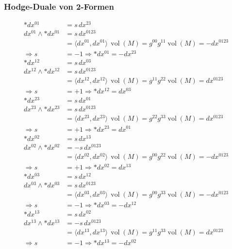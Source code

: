 \subsubsection{Hodge-Duale von 2-Formen}
\begin{align*}
	\ast dx^{01} &= s \, dx^{23} \\
	dx^{01} \wedge \ast dx^{01} &= s \, dx^{0123} \\
	&= \langle dx^{01}, dx^{01} \rangle \, \operatorname{vol}(M) 
	= g^{00} g^{11} \operatorname{vol}(M) = -dx^{0123} \\
	\Rightarrow s &= -1 \Rightarrow \boxed{\ast dx^{01} = - dx^{23}}
	\\[1em]
	\ast dx^{12} &= s \, dx^{03} \\
	dx^{12} \wedge \ast dx^{12} &= s \, dx^{0123} \\
	&= \langle dx^{12}, dx^{12} \rangle \, \operatorname{vol}(M) 
	= g^{11} g^{22} \operatorname{vol}(M) = dx^{0123} \\
	\Rightarrow s &= +1 \Rightarrow \boxed{\ast dx^{12} = dx^{03}}
	\\[1em]
	\ast dx^{23} &= s \, dx^{01} \\
	dx^{23} \wedge \ast dx^{23} &= s \, dx^{0123} \\
	&= \langle dx^{23}, dx^{23} \rangle \, \operatorname{vol}(M) 
	= g^{22} g^{33} \operatorname{vol}(M) = dx^{0123} \\
	\Rightarrow s &= +1 \Rightarrow \boxed{\ast dx^{23} = dx^{01}}
	\\[1em]
	\ast dx^{02} &= s \, dx^{13} \\
	dx^{02} \wedge \ast dx^{02} &= -s \, dx^{0123} \\
	&= \langle dx^{02}, dx^{02} \rangle \, \operatorname{vol}(M) 
	= g^{00} g^{22} \operatorname{vol}(M) = -dx^{0123} \\
	\Rightarrow s &= +1 \Rightarrow \boxed{\ast dx^{02} = dx^{13}}
	\\[1em]
	\ast dx^{03} &= s \, dx^{12} \\
	dx^{03} \wedge \ast dx^{03} &= s \, dx^{0123} \\
	&= \langle dx^{03}, dx^{03} \rangle \, \operatorname{vol}(M) 
	= g^{00} g^{33} \operatorname{vol}(M) = -dx^{0123} \\
	\Rightarrow s &= -1 \Rightarrow \boxed{\ast dx^{03} = - dx^{12}}
	\\[1em]
	\ast dx^{13} &= s \, dx^{02} \\
	dx^{13} \wedge \ast dx^{13} &= -s \, dx^{0123} \\
	&= \langle dx^{13}, dx^{13} \rangle \, \operatorname{vol}(M) 
	= g^{11} g^{33} \operatorname{vol}(M) = dx^{0123} \\
	\Rightarrow s &= -1 \Rightarrow \boxed{\ast dx^{13} = - dx^{02}}
\end{align*}

